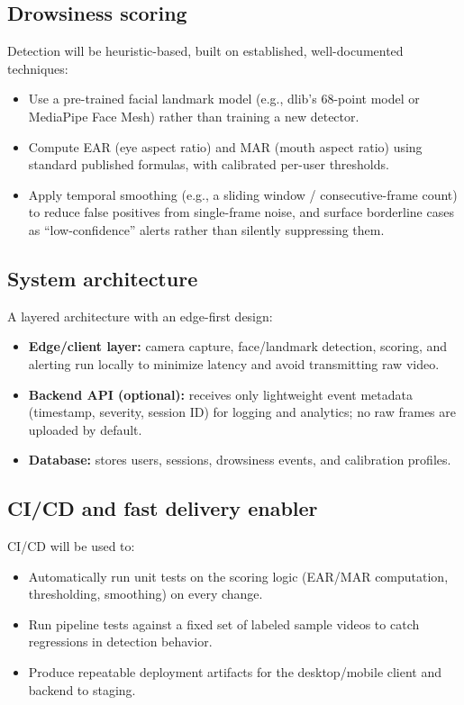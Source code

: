 \documentclass[11pt,a4paper]{article}
\begin{document}
\subsection{Drowsiness scoring}
Detection will be heuristic-based, built on established,
well-documented techniques:
\begin{itemize}[leftmargin=0.7cm]
    \item Use a pre-trained facial landmark model (e.g., dlib's 68-point model or MediaPipe Face Mesh) rather than training a new detector.
    \item Compute EAR (eye aspect ratio) and MAR (mouth aspect ratio) using standard published formulas, with calibrated per-user thresholds.
    \item Apply temporal smoothing (e.g., a sliding window / consecutive-frame count) to reduce false positives from single-frame noise, and surface borderline cases as ``low-confidence'' alerts rather than silently suppressing them.
\end{itemize}

\subsection{System architecture}
A layered architecture with an edge-first design:
\begin{itemize}[leftmargin=0.7cm]
    \item \textbf{Edge/client layer:} camera capture, face/landmark detection, scoring, and alerting run locally to minimize latency and avoid transmitting raw video.
    \item \textbf{Backend API (optional):} receives only lightweight event metadata (timestamp, severity, session ID) for logging and analytics; no raw frames are uploaded by default.
    \item \textbf{Database:} stores users, sessions, drowsiness events, and calibration profiles.
\end{itemize}

\subsection{CI/CD and fast delivery enabler}
CI/CD will be used to:
\begin{itemize}[leftmargin=0.7cm]
    \item Automatically run unit tests on the scoring logic (EAR/MAR computation, thresholding, smoothing) on every change.
    \item Run pipeline tests against a fixed set of labeled sample videos to catch regressions in detection behavior.
    \item Produce repeatable deployment artifacts for the desktop/mobile client and backend to staging.
\end{itemize}
\end{document}

